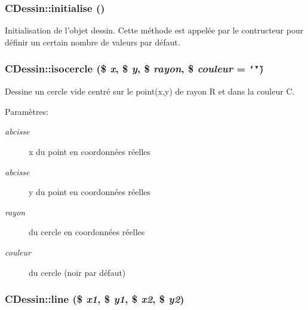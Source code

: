 \hypertarget{classCDessin_a3}{
\subsubsection[initialise]{\setlength{\rightskip}{0pt plus 5cm}CDessin::initialise ()}}
\label{classCDessin_a3}


Initialisation de l'objet dessin. Cette m\'{e}thode est appel\'{e}e par le contructeur pour d\'{e}finir un certain nombre de valeurs par d\'{e}faut.\hypertarget{classCDessin_a17}{
\subsubsection[isocercle]{\setlength{\rightskip}{0pt plus 5cm}CDessin::isocercle (\$ {\em x}, \$ {\em y}, \$ {\em rayon}, \$ {\em couleur} = {\tt \char`\"{}\char`\"{}})}}
\label{classCDessin_a17}


Dessine un cercle vide centr\'{e} sur le point(x,y) de rayon R et dans la couleur C. \begin{Desc}
\item[Param\`{e}tres:]
\begin{description}
\item[{\em abcisse}]x du point en coordonn\'{e}es r\'{e}elles \item[{\em abcisse}]y du point en coordonn\'{e}es r\'{e}elles \item[{\em rayon}]du cercle en coordonn\'{e}es r\'{e}elles \item[{\em couleur}]du cercle (noir par d\'{e}faut)\end{description}
\end{Desc}
\hypertarget{classCDessin_a9}{
\subsubsection[line]{\setlength{\rightskip}{0pt plus 5cm}CDessin::line (\$ {\em x1}, \$ {\em y1}, \$ {\em x2}, \$ {\em y2})}}
\label{classCDessin_a9}


